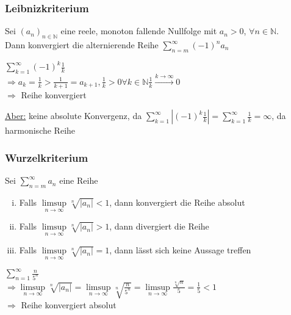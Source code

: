 \documentclass[a4paper,12pt]{article}
\begin{document}
	\subsubsection{Leibnizkriterium}
	\begin{defi}
		Sei $\left(a_n\right)_{n \in \mathbb{N}}$ eine reele, monoton fallende Nullfolge mit $a_n > 0$, $\forall n \in \mathbb{N}$.\\
		Dann konvergiert die alternierende Reihe $\sum_{n = m}^{\infty} \left(-1\right)^n a_n$
	\end{defi}
	\begin{bsp}
		\begin{center}
			$\sum_{k=1}^{\infty} \left(-1\right) ^k \frac{1}{k}$\\
			$\Rightarrow a_k = \frac{1}{k} > \frac{1}{k+1} = a_{k+1}, \frac{1}{k} > 0 \forall k \in \mathbb{N} \frac{1}{k} \xrightarrow{k \rightarrow \infty} 0$\\
			$\Rightarrow$ Reihe konvergiert
		\end{center}
	\end{bsp}
	\underline{Aber:} keine absolute Konvergenz, da $\sum_{k=1}^{\infty} \left|\left(-1\right)^k \frac{1}{k}\right| = \sum_{k=1}^{\infty} \frac{1}{k} = \infty$, da harmonische Reihe
	\newpage
	
	\subsubsection{Wurzelkriterium}
	\begin{defi}
		Sei $\sum_{n = m}^{\infty} a_n$ eine Reihe
		\begin{enumerate}[i)]
			\item Falls $\limsup \limits_{n \rightarrow \infty} \sqrt[n]{\left|a_n\right|} < 1$, dann konvergiert die Reihe absolut
			\item Falls $\limsup \limits_{n \rightarrow \infty} \sqrt[n]{\left|a_n\right|} > 1$, dann divergiert die Reihe
			\item Falls $\limsup \limits_{n \rightarrow \infty} \sqrt[n]{\left|a_n\right|} = 1$, dann lässt sich keine Aussage treffen
		\end{enumerate}
	\end{defi}
	\begin{bsp}
		\begin{center}
			$\sum_{n=1}^{\infty} \frac{n}{5^n}$\\
			$\Rightarrow \limsup \limits_{n \rightarrow \infty} \sqrt[n]{\left|a_n\right|} = \limsup \limits_{n \rightarrow \infty} \sqrt[n]{\frac{n}{5^n}} = \limsup \limits_{n \rightarrow \infty} \frac{\sqrt[n]{n}}{5} = \frac{1}{5} < 1 $\\
			$\Rightarrow$ Reihe konvergiert absolut
		\end{center}
	\end{bsp}
\end{document}
